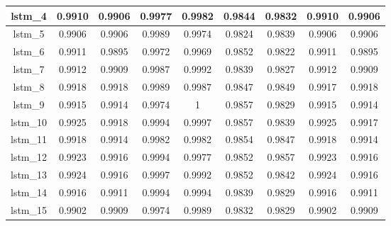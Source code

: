 \begin{table}[h]
\begin{tabular} {|c|c|c|c|c|c|c|c|c| }
        lstm\_4  & 0.9910                        & 0.9906                         & 0.9977                      & 0.9982                  & 0.9844 & 0.9832 & 0.9910 & 0.9906 \\ \hline
        lstm\_5  & 0.9906                        & 0.9906                         & 0.9989                      & 0.9974                  & 0.9824 & 0.9839 & 0.9906 & 0.9906 \\ \hline
        lstm\_6  & 0.9911                        & 0.9895                         & 0.9972                      & 0.9969                  & 0.9852 & 0.9822 & 0.9911 & 0.9895 \\ \hline
        lstm\_7  & 0.9912                        & 0.9909                         & 0.9987                      & 0.9992                  & 0.9839 & 0.9827 & 0.9912 & 0.9909 \\ \hline
        lstm\_8  & 0.9918                        & 0.9918                         & 0.9989                      & 0.9987                  & 0.9847 & 0.9849 & 0.9917 & 0.9918 \\ \hline
        lstm\_9  & 0.9915                        & 0.9914                         & 0.9974                      & 1                       & 0.9857 & 0.9829 & 0.9915 & 0.9914 \\ \hline
        lstm\_10 & 0.9925                        & 0.9918                         & 0.9994                      & 0.9997                  & 0.9857 & 0.9839 & 0.9925 & 0.9917 \\ \hline
        lstm\_11 & 0.9918                        & 0.9914                         & 0.9982                      & 0.9982                  & 0.9854 & 0.9847 & 0.9918 & 0.9914 \\ \hline
        lstm\_12 & 0.9923                        & 0.9916                         & 0.9994                      & 0.9977                  & 0.9852 & 0.9857 & 0.9923 & 0.9916 \\ \hline
        lstm\_13 & 0.9924                        & 0.9916                         & 0.9997                      & 0.9992                  & 0.9852 & 0.9842 & 0.9924 & 0.9916 \\ \hline
        lstm\_14 & 0.9916                        & 0.9911                         & 0.9994                      & 0.9994                  & 0.9839 & 0.9829 & 0.9916 & 0.9911 \\ \hline
        lstm\_15 & 0.9902                        & 0.9909                         & 0.9974                      & 0.9989                  & 0.9832 & 0.9829 & 0.9902 & 0.9909 \\ \hline

\end{tabular}
\end{table}
